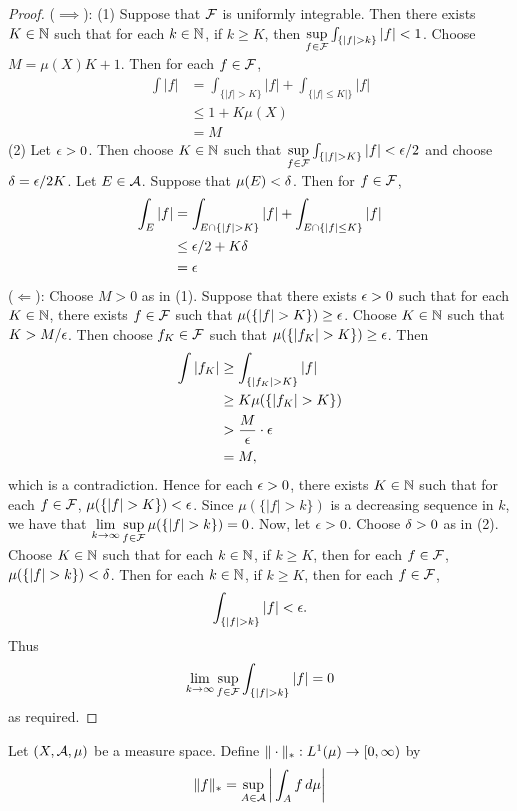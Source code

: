 \documentclass{book}
\begin{document}
	\begin{proof}
		($\implies$): (1) Suppose that $\mathcal{F}$ is uniformly integrable. Then there exists $K \in \mathbb{N}$ such that for each $k \in \mathbb{N}$, if $k \geq K$, then $\sup\limits_{f \in \MF} \int_{\{|f|>k\}} |f| < 1$. Choose $M = \mu(X)K + 1$. Then for each $f \in \mathcal{F}$, 
		\begin{align*}
			\int |f| 
			&= \int_{\{|f|>K\}} |f| + \int_{\{|f| \leq K|\}}|f|\\
			& \leq 1 + K\mu(X)\\
			&=M
		\end{align*}
		(2) Let $\epsilon >0$. Then choose $K \in \mathbb{N}$ such that $\sup\limits_{f \in \MF}\int_{\{|f|>K\}} |f| < \ep/2$ and choose $\delta = \epsilon/2K$. Let $E \in \mathcal{A}$. Suppose that $\mu(E) < \delta$. Then for $f \in \mathcal{F}$, 
		\begin{align*}
			\int_E |f| 
			&= \int_{E \cap \{|f| > K\}} |f| + \int_{E \cap \{|f| \leq K\}} |f|\\
			& \leq \epsilon/2 + K\delta \\
			&=  \epsilon
		\end{align*}
		($\Leftarrow$): Choose $M >0$ as in (1). Suppose that there exists $\epsilon >0$ such that for each $K \in \mathbb{N}$, there exists $f \in \mathcal{F}$ such that $\mu(\{|f| > K\}) \geq \epsilon$. Choose $K \in \mathbb{N}$ such that $K > M/\epsilon$. Then choose $f_K \in \mathcal{F}$ such that $\mu(\{|f_K| > K\}) \geq \epsilon$. Then 
		\begin{align*}
			\int |f_K| 
			&\geq \int_{\{|f_K| > K\}} |f|\\
			& \geq K\mu(\{|f_K| > K\})\\
			& > \frac{M}{\epsilon} \cdot \epsilon\\
			&= M, \\
		\end{align*}  
		which is a contradiction. Hence for each $\epsilon >0$, there exists $K \in \mathbb{N}$ such that for each $f \in \mathcal{F}$, $\mu(\{|f| > K\}) < \epsilon$. Since $\mu(\{|f| > k\})$ is a decreasing sequence in $k$, we have that $\lim\limits_{k \rightarrow \infty} \sup\limits_{f \in \mathcal{F}} \mu(\{|f| > k\}) = 0$. Now, let $\epsilon > 0$. Choose $\delta >0$ as in (2). Choose $K \in \mathbb{N}$ such that for each $k \in \mathbb{N}$, if $k \geq K$, then for each $f \in \mathcal{F}$, $\mu(\{|f| > k\}) < \delta$. Then for each $k \in \mathbb{N}$, if $k \geq K$, then for each $f \in \mathcal{F}$, 
		$$\int_{\{|f| > k\}} |f| < \epsilon.$$ Thus $$\lim\limits_{k \rightarrow \infty} \sup\limits_{f \in \MF} \int_{\{|f|>k\}} |f| = 0$$ as required.
	\end{proof}
	
	\begin{defn} 
	Let $(X, \mathcal{A}, \mu)$ be a measure space. Define $\| \cdot \|_*: L^1(\mu) \rightarrow [0,\infty)$ by  
	 $$\| f \|_* = \sup\limits_{A \in \mathcal{A}} \bigg | \int_A f \, d \mu \bigg |$$ 
	\end{defn}
	
\end{document}
